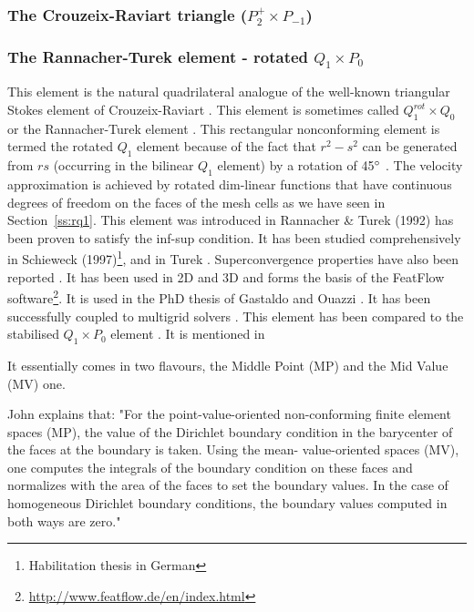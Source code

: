 \subsubsection{The Crouzeix-Raviart triangle ($P_2^+\times P_{-1}$)}
\label{sec:crouzeix-raviart}


\subsubsection{The Rannacher-Turek element - rotated $Q_1\times P_0$} \label{ss:RTq1p0}

This element is the natural quadrilateral analogue
of the well-known triangular Stokes element of Crouzeix-Raviart \cite{crra73}.
This element is sometimes called $Q_1^{rot} \times Q_0$ or the Rannacher-Turek element 
\cite[Section 3.6.5]{john16}.
This rectangular nonconforming \cite{crfa89} element is termed the rotated $Q_1$ element 
because of the fact that $r^2-s^2$ can be generated from $rs$ (occurring in the bilinear $Q_1$ 
element) by a rotation of 45$\degree$ \cite[p93]{chen}.
The velocity approximation is achieved by rotated dim-linear functions that have 
continuous degrees of freedom on
the faces of the mesh cells as we have seen in Section~\ref{ss:rq1}.
This element was introduced in Rannacher \& Turek (1992) \cite{ratu92} 
has been proven to satisfy the inf-sup condition. It has been studied comprehensively in Schieweck 
(1997)\footnote{Habilitation thesis in German}, \cite{shzh06} and in Turek \cite{ture94,ture96}.
Superconvergence properties have also been reported \cite{misx06,misx07}.
It has been used in 2D \cite{maky17} and 3D \cite{klll96,gekm08} and forms the basis of the FeatFlow 
software\footnote{\url{http://www.featflow.de/en/index.html}}. 
It is used in the PhD thesis of Gastaldo \cite{gast07} and Ouazzi \cite{ouaz05}.
It has been 
successfully coupled to multigrid solvers \cite{chos98,tuos02}.
This element has been compared to the stabilised $Q_1\times P_0$ element \cite{lisi13}.
It is mentioned in \cite{hans11}

It essentially comes in two flavours, the Middle Point (MP) and the Mid Value (MV) one.

\begin{remark} 
John \cite{john16} explains that: "For the point-value-oriented non-conforming finite element spaces (MP), 
the value of the Dirichlet boundary
condition in the barycenter of the faces at the boundary is taken. Using the mean-
value-oriented spaces (MV), one computes the integrals of the boundary condition on
these faces and normalizes with the area of the faces to set the boundary values.
In the case of homogeneous Dirichlet boundary conditions, the boundary values
computed in both ways are zero."
\end{remark}

